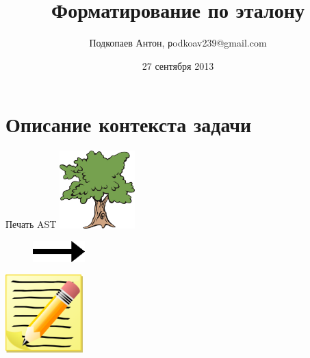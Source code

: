 \documentclass[sans]{beamer}
\begin{document}
\title[Форматирование по эталону] {Форматирование по эталону}



\author
[Подкопаев Антон]{Подкопаев Антон, \texttt podkoav239@gmail.com}
\date [27-09-13]{27 сентября 2013}

\begin{frame}[plain]
	\titlepage
\end{frame}

\section{Описание контекста задачи}

\begin{frame}{Печать AST}
	\includegraphics[height = 3cm]{images/tree.jpg}
	\begin{figure}
		\includegraphics[width = 2cm]{images/arrow.png}
	\end{figure}

	\hfill
	\includegraphics[height = 3cm]{images/text.png}
\end{frame}
\end{document}
